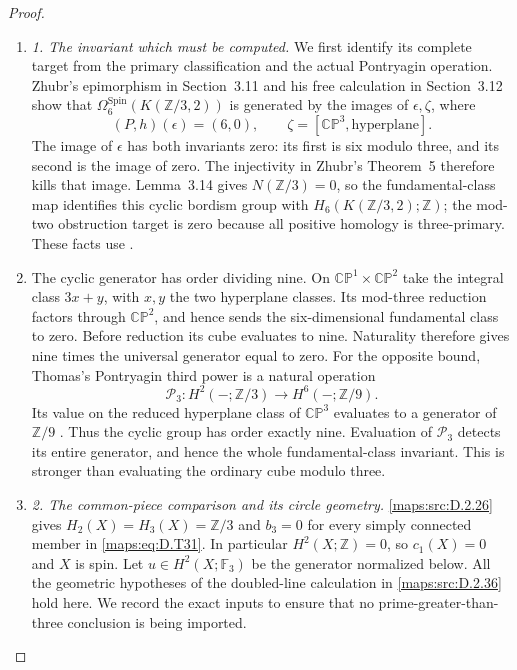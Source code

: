 \begin{proof}
\begin{enumerate}[label=\arabic*.,leftmargin=*]
\item \emph{1. The invariant which must be computed.}
We first identify its complete target from the primary classification
and the actual Pontryagin operation. Zhubr's epimorphism in Section~3.11
and his free calculation in Section~3.12 show that
$\Omega^{\mathrm{Spin}}_6(K(\mathbb Z/3,2))$ is generated by the
images of $\epsilon,\zeta$, where
\[
 (P,h)(\epsilon)=(6,0),\qquad
 \zeta=[\mathbb {CP}^3,\text{hyperplane}].
\]
The image of $\epsilon$ has both invariants zero: its first is six
modulo three, and its second is the image of zero. The injectivity
in Zhubr's Theorem~5 therefore kills that image.
Lemma~3.14 gives $N(\mathbb Z/3)=0$, so the fundamental-class map
identifies this cyclic bordism group with
$H_6(K(\mathbb Z/3,2);\mathbb Z)$; the mod-two obstruction target
is zero because all positive homology is three-primary.
These facts use \cite[Sections 3.11--3.14 and Theorem 5]{manZhubr75}.

\item The cyclic generator has order dividing nine. On
$\mathbb {CP}^1\times\mathbb {CP}^2$ take the integral class
$3x+y$, with $x,y$ the two hyperplane classes. Its mod-three
reduction factors through $\mathbb {CP}^2$, and hence sends the
six-dimensional fundamental class to zero. Before reduction its
cube evaluates to nine. Naturality therefore gives nine times the
universal generator equal to zero.
For the opposite bound, Thomas's Pontryagin third power is a natural
operation
\[
 \mathcal P_3:H^2(-;\mathbb Z/3)\longrightarrow
                              H^6(-;\mathbb Z/9).
\]
Its value on the reduced hyperplane class of $\mathbb {CP}^3$
evaluates to a generator of $\mathbb Z/9$
\cite[equation (2.8), p.267]{ffThomas56}. Thus the cyclic group has
order exactly nine. Evaluation of $\mathcal P_3$ detects its entire
generator, and hence the whole fundamental-class invariant. This is
stronger than evaluating the ordinary cube modulo three.

\item \emph{2. The common-piece comparison and its circle geometry.}
\ref{maps:src:D.2.26} gives $H_2(X)=H_3(X)=\mathbb Z/3$ and $b_3=0$ for every
simply connected member in \eqref{maps:eq:D.T31}. In particular $H^2(X;\mathbb Z)=0$,
so $c_1(X)=0$ and $X$ is spin. Let
$u\in H^2(X;\mathbb F_3)$ be the generator normalized below.
All the geometric hypotheses of the doubled-line calculation in
\ref{maps:src:D.2.36} hold here. We record the exact inputs to ensure that no
prime-greater-than-three conclusion is being imported.


\end{enumerate}
\end{proof}
